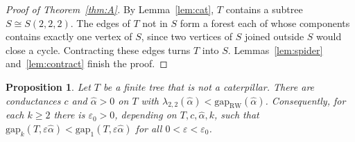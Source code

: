 \documentclass[11pt]{article}
\newtheorem{proposition}[theorem]{Proposition}
\theoremstyle{remark}
\newcommand{\gap}{\mathrm{gap}}
\newcommand{\RW}{\mathrm{RW}}
\newcommand{\eps}{\varepsilon}
\begin{document}
\begin{proof}[Proof of Theorem~\ref{thm:A}]
By Lemma~\ref{lem:cat}, $T$ contains a subtree $S\cong S(2,2,2)$. The edges of $T$ not in $S$ form a forest each of whose components contains exactly one vertex of $S$, since two vertices of $S$ joined outside $S$ would close a cycle. Contracting these edges turns $T$ into $S$. Lemmas~\ref{lem:spider} and~\ref{lem:contract} finish the proof.
\end{proof}

\begin{proposition}\label{prop:small}
Let $T$ be a finite tree that is not a caterpillar. There are conductances $c$ and $\hat\alpha>0$ on $T$ with $\lambda_{2,2}(\hat\alpha)<\gap_{\RW}(\hat\alpha)$. Consequently, for each $k\ge2$ there is $\eps_0>0$, depending on $T,c,\hat\alpha,k$, such that $\gap_k(T,\eps\hat\alpha)<\gap_1(T,\eps\hat\alpha)$ for all $0<\eps<\eps_0$.
\end{proposition}
\end{document}
